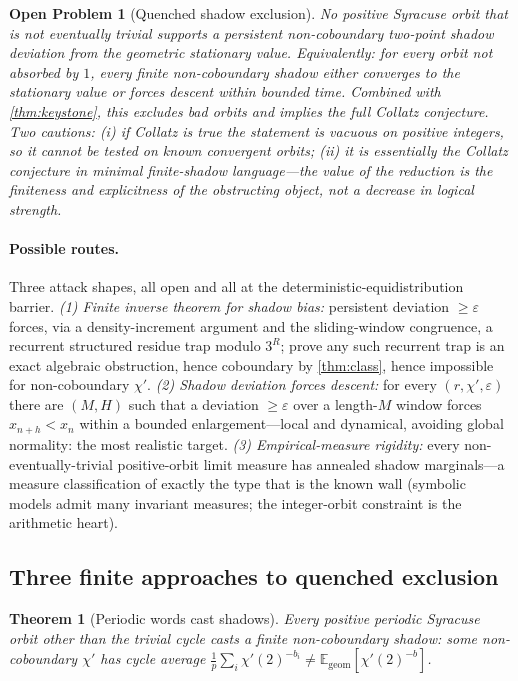 \documentclass[11pt]{article}
\newcommand{\E}{\mathbb{E}}
\theoremstyle{plain}
\newtheorem{theorem}{Theorem}
\newtheorem{openproblem}{Open Problem}
\theoremstyle{definition}
\theoremstyle{remark}
\begin{document}
\begin{openproblem}[Quenched shadow exclusion]\label{op:quenched}
No positive Syracuse orbit that is \emph{not eventually trivial}
supports a persistent non-coboundary two-point shadow deviation from the
geometric stationary value. Equivalently: for every orbit not absorbed
by $1$, every finite non-coboundary shadow either converges to the
stationary value or forces descent within bounded time. Combined with
\cref{thm:keystone}, this excludes bad orbits and implies the full
Collatz conjecture. Two cautions: \emph{(i)} if Collatz is true the
statement is vacuous on positive integers, so it cannot be tested on
known convergent orbits; \emph{(ii)} it is essentially the Collatz
conjecture in minimal finite-shadow language---the value of the
reduction is the finiteness and explicitness of the obstructing object,
not a decrease in logical strength.
\end{openproblem}

\paragraph{Possible routes.} Three attack shapes, all open and all at
the deterministic-equidistribution barrier. \emph{(1) Finite inverse
theorem for shadow bias:} persistent deviation $\ge\varepsilon$ forces,
via a density-increment argument and the sliding-window congruence, a
recurrent structured residue trap modulo $3^R$; prove any such recurrent
trap is an exact algebraic obstruction, hence coboundary by
\cref{thm:class}, hence impossible for non-coboundary $\chi'$. \emph{(2)
Shadow deviation forces descent:} for every $(r,\chi',\varepsilon)$
there are $(M,H)$ such that a deviation $\ge\varepsilon$ over a
length-$M$ window forces $x_{n+h}<x_n$ within a bounded
enlargement---local and dynamical, avoiding global normality: the most
realistic target. \emph{(3) Empirical-measure rigidity:} every
non-eventually-trivial positive-orbit limit measure has annealed shadow
marginals---a measure classification of exactly the type that is the
known wall (symbolic models admit many invariant measures; the
integer-orbit constraint is the arithmetic heart).

\subsection*{Three finite approaches to quenched exclusion}

\begin{theorem}[Periodic words cast shadows]\label{thm:periodic}
Every positive periodic Syracuse orbit other than the trivial cycle
casts a finite non-coboundary shadow: some non-coboundary $\chi'$ has
cycle average $\frac1p\sum_i\chi'(2)^{-b_i}\ne
\E_{\mathrm{geom}}[\chi'(2)^{-b}]$.
\end{theorem}
\end{document}
